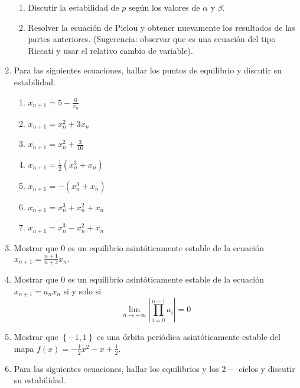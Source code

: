 \documentclass{article}
\begin{document}
\begin{enumerate}
\begin{enumerate}
\item Discutir la estabilidad de $p$ seg\'{u}n los valores de $\alpha $ y $%
\beta $.

\item Resolver la ecuaci\'{o}n de Pielou y obtener nuevamente los resultados
de las partes anteriores. (Sugerencia: observar que es una ecuaci\'{o}n del
tipo Riccati y usar el relativo cambio de variable).
\end{enumerate}

\item Para las siguientes ecuaciones, hallar los puntos de equilibrio y
discutir su estabilidad.

\begin{enumerate}
\item $x_{n+1}=5-\frac{6}{x_{n}}$

\item $x_{n+1}=x_{n}^{2}+3x_{n}$

\item $x_{n+1}=x_{n}^{2}+\frac{3}{16}$

\item $x_{n+1}=\frac{1}{2}\left( x_{n}^{3}+x_{n}\right) $

\item $x_{n+1}=-\left( x_{n}^{3}+x_{n}\right) $

\item $x_{n+1}=x_{n}^{3}+x_{n}^{2}+x_{n}$

\item $x_{n+1}=x_{n}^{3}-x_{n}^{2}+x_{n}$
\end{enumerate}

\item Mostrar que $0$ es un equilibrio asint\'{o}ticamente estable de la
ecuaci\'{o}n $x_{n+1}=\frac{n+1}{n+2}x_{n}.$

\item Mostrar que $0$ es un equilibrio asint\'{o}ticamente estable de la
ecuaci\'{o}n $x_{n+1}=a_{n}x_{n}$ si y solo si 
\begin{equation*}
\underset{n\rightarrow +\infty }{\lim }\left\vert \underset{i=0}{\overset{n-1%
}{\prod }}a_{i}\right\vert =0
\end{equation*}

\item Mostrar que $\left\{ -1,1\right\} $ es una \'{o}rbita peri\'{o}dica
asint\'{o}ticamente estable del mapa $f(x)=-\frac{1}{2}x^{2}-x+\frac{1}{2}$.

\item Para las siguientes ecuaciones, hallar los equilibrios y los $2-$%
ciclos y discutir su estabilidad.


\end{enumerate}
\end{document}

